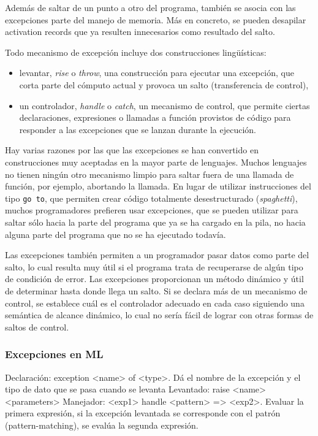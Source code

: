 \documentclass[10pt,a4paper]{report}
\begin{document}
Además de saltar de un punto a otro del programa, también se asocia
con las excepciones parte del manejo de memoria. Más en concreto, se
pueden desapilar activation records que ya resulten innecesarios como
resultado del salto.

Todo mecanismo de excepción incluye dos construcciones lingüísticas:

\begin{itemize}
\item {levantar}, {\it rise} o {\it throw}, una construcción para
  ejecutar una excepción, que corta parte del cómputo actual y provoca
  un salto (transferencia de control),
\item un controlador, {\it handle} o {\it catch}, un mecanismo
  de control, que permite ciertas declaraciones, expresiones o
  llamadas a función provistos de código para responder a las
  excepciones que se lanzan durante la ejecución.
\end{itemize}

Hay varias razones por las que las excepciones se han convertido en
construcciones muy aceptadas en la mayor parte de lenguajes. Muchos
lenguajes no tienen ningún otro mecanismo limpio para saltar fuera de
una llamada de función, por ejemplo, abortando la llamada. En lugar de
utilizar instrucciones del tipo \verb|go to|, que permiten crear
código totalmente desestructurado (\textit{spaghetti}), muchos
programadores prefieren usar excepciones, que se pueden utilizar para
saltar sólo hacia la parte del programa que ya se ha cargado en la
pila, no hacia alguna parte del programa que no se ha ejecutado
todavía.

Las excepciones también permiten a un programador pasar datos como
parte del salto, lo cual resulta muy útil si el programa trata de
recuperarse de algún tipo de condición de error. Las excepciones
proporcionan un método dinámico y útil de determinar hasta donde llega
un salto. Si se declara más de un mecanismo de control, se establece
cuál es el controlador adecuado en cada caso siguiendo una semántica
de alcance dinámico, lo cual no sería fácil de lograr con otras formas
de saltos de control.


\subsubsection{Excepciones en ML}

Declaración: exception <name> of <type>. Dá el nombre de la excepción y el tipo de dato que se pasa cuando se levanta
Levantado: raise <name> <parameters>
Manejador: <exp1> handle <pattern> =>
<exp2>. Evaluar la primera expresión, si la excepción levantada se corresponde con el patrón (pattern-matching), se evalúa la segunda expresión.
\end{document}
